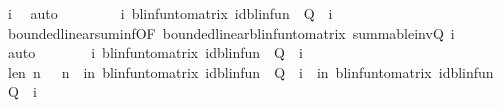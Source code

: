 \begin{isabellebody}
\ i{}\ \isamarkupfalse%
\ auto\isanewline
\ \ \isamarkupfalse%
\ \isamarkupfalse%
\ {\isachardoublequoteopen}{\isasymdots}\ {\isacharequal}{\kern0pt}\ \ {\isacharparenleft}{\kern0pt}{\isacharparenleft}{\kern0pt}{\isasymSum}i{\isachardot}{\kern0pt}\ blinfun{\isacharunderscore}{\kern0pt}to{\isacharunderscore}{\kern0pt}matrix\ {\isacharparenleft}{\kern0pt}{\isacharparenleft}{\kern0pt}id{\isacharunderscore}{\kern0pt}blinfun\ {\isacharminus}{\kern0pt}\ Q{}{\isacharparenright}{\kern0pt}\ {\isacharcircum}{\kern0pt}{\isacharcircum}{\kern0pt}\ i{\isacharparenright}{\kern0pt}{\isacharparenright}{\kern0pt}{\isacharparenright}{\kern0pt}{\isachardoublequoteclose}\isanewline
\ \ \ \ \isamarkupfalse%
\ bounded{\isacharunderscore}{\kern0pt}linear{\isachardot}{\kern0pt}suminf{\isacharbrackleft}{\kern0pt}OF\ bounded{\isacharunderscore}{\kern0pt}linear{\isacharunderscore}{\kern0pt}blinfun{\isacharunderscore}{\kern0pt}to{\isacharunderscore}{\kern0pt}matrix{\isacharbrackright}{\kern0pt}\ summable{\isacharunderscore}{\kern0pt}inv{\isacharunderscore}{\kern0pt}Q\ i{}{\isacharparenleft}{\kern0pt}{}{\isacharparenright}{\kern0pt}\ \isanewline
\ \ \ \ \isamarkupfalse%
\ auto\isanewline
\ \ \isamarkupfalse%
\ \isamarkupfalse%
\ {\isachardoublequoteopen}{\isasymdots}\ {\isasymle}\ {\isacharparenleft}{\kern0pt}{\isasymSum}i{\isachardot}{\kern0pt}\ blinfun{\isacharunderscore}{\kern0pt}to{\isacharunderscore}{\kern0pt}matrix\ {\isacharparenleft}{\kern0pt}{\isacharparenleft}{\kern0pt}id{\isacharunderscore}{\kern0pt}blinfun\ {\isacharminus}{\kern0pt}\ Q{}{\isacharparenright}{\kern0pt}\ {\isacharcircum}{\kern0pt}{\isacharcircum}{\kern0pt}\ i{\isacharparenright}{\kern0pt}{\isacharparenright}{\kern0pt}{\isachardoublequoteclose}\isanewline
\ \ \isamarkupfalse%
\ {\isacharminus}{\kern0pt}\isanewline
\ \ \ \ \isamarkupfalse%
\ le{\isacharunderscore}{\kern0pt}n{\isacharcolon}{\kern0pt}\ {\isachardoublequoteopen}{\isasymAnd}n{\isachardot}{\kern0pt}\ {}\ {\isasymle}\ n\ {\isasymLongrightarrow}\ {\isacharparenleft}{\kern0pt}{\isasymSum}i{\isacharless}{\kern0pt}n{\isachardot}{\kern0pt}\ blinfun{\isacharunderscore}{\kern0pt}to{\isacharunderscore}{\kern0pt}matrix\ {\isacharparenleft}{\kern0pt}{\isacharparenleft}{\kern0pt}id{\isacharunderscore}{\kern0pt}blinfun\ {\isacharminus}{\kern0pt}\ Q{}{\isacharparenright}{\kern0pt}\ {\isacharcircum}{\kern0pt}{\isacharcircum}{\kern0pt}\ i{\isacharparenright}{\kern0pt}{\isacharparenright}{\kern0pt}\ {\isasymle}\ {\isacharparenleft}{\kern0pt}{\isasymSum}i{\isacharless}{\kern0pt}n{\isachardot}{\kern0pt}\ blinfun{\isacharunderscore}{\kern0pt}to{\isacharunderscore}{\kern0pt}matrix\ {\isacharparenleft}{\kern0pt}{\isacharparenleft}{\kern0pt}id{\isacharunderscore}{\kern0pt}blinfun\ {\isacharminus}{\kern0pt}\ Q{}{\isacharparenright}{\kern0pt}\ {\isacharcircum}{\kern0pt}{\isacharcircum}{\kern0pt}\ i{\isacharparenright}{\kern0pt}{\isacharparenright}{\kern0pt}{\isachardoublequoteclose}\isanewline

\end{isabellebody}

